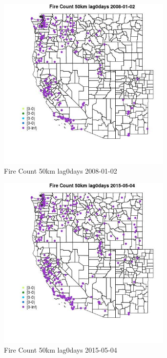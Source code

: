 \begin{figure} 
\centering  
\includegraphics[width=0.77\textwidth]{Code_Outputs/Report_ML_input_PM25_Step4_part_e_de_duplicated_aves_compiled_2019-05-18wNAs_MapObsFire_Count_50km_lag0days2008-01-02.jpg} 
\caption{\label{fig:Report_ML_input_PM25_Step4_part_e_de_duplicated_aves_compiled_2019-05-18wNAsMapObsFire_Count_50km_lag0days2008-01-02}Fire Count 50km lag0days 2008-01-02} 
\end{figure} 
 

\begin{figure} 
\centering  
\includegraphics[width=0.77\textwidth]{Code_Outputs/Report_ML_input_PM25_Step4_part_e_de_duplicated_aves_compiled_2019-05-18wNAs_MapObsFire_Count_50km_lag0days2015-05-04.jpg} 
\caption{\label{fig:Report_ML_input_PM25_Step4_part_e_de_duplicated_aves_compiled_2019-05-18wNAsMapObsFire_Count_50km_lag0days2015-05-04}Fire Count 50km lag0days 2015-05-04} 
\end{figure} 
 

